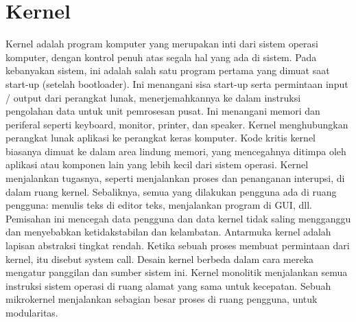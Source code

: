 
\section{Kernel}
 Kernel adalah program komputer yang merupakan inti dari sistem operasi komputer, dengan kontrol penuh atas segala hal yang ada di sistem. Pada kebanyakan sistem, ini adalah salah satu program pertama yang dimuat saat start-up (setelah bootloader). 
 Ini menangani sisa start-up serta permintaan input / output dari perangkat lunak, menerjemahkannya ke dalam instruksi pengolahan data untuk unit pemrosesan pusat. Ini menangani memori dan periferal seperti keyboard, monitor, printer, dan speaker.
 Kernel menghubungkan perangkat lunak aplikasi ke perangkat keras komputer.
 Kode kritis kernel biasanya dimuat ke dalam area lindung memori, yang mencegahnya ditimpa oleh aplikasi atau komponen lain yang lebih kecil dari sistem operasi. Kernel menjalankan tugasnya, seperti menjalankan proses dan penanganan interupsi, di dalam ruang kernel. 
 Sebaliknya, semua yang dilakukan pengguna ada di ruang pengguna: menulis teks di editor teks, menjalankan program di GUI, dll. Pemisahan ini mencegah data pengguna dan data kernel tidak saling mengganggu dan menyebabkan ketidakstabilan dan kelambatan. 
 Antarmuka kernel adalah lapisan abstraksi tingkat rendah. Ketika sebuah proses membuat permintaan dari kernel, itu disebut system call. Desain kernel berbeda dalam cara mereka mengatur panggilan dan sumber sistem ini. 
 Kernel monolitik menjalankan semua instruksi sistem operasi di ruang alamat yang sama untuk kecepatan. Sebuah mikrokernel menjalankan sebagian besar proses di ruang pengguna, untuk modularitas. 

